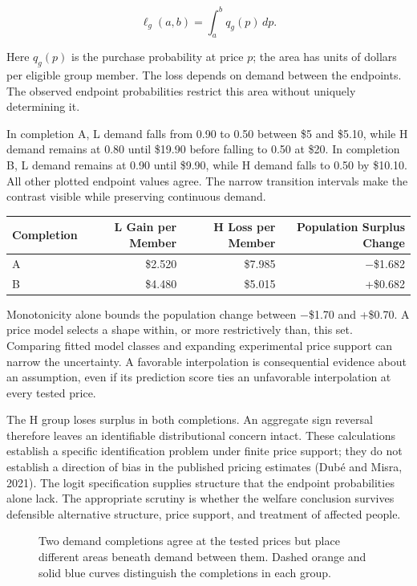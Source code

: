 \[
\ell_g(a,b)=\int_a^b q_g(p)\,dp.
\]

Here \(q_g(p)\) is the purchase probability at price \(p\); the area has
units of dollars per eligible group member. The loss depends on demand
between the endpoints. The observed endpoint probabilities restrict this
area without uniquely determining it.

In completion A, L demand falls from 0.90 to 0.50 between \$5 and
\$5.10, while H demand remains at 0.80 until \$19.90 before falling to
0.50 at \$20. In completion B, L demand remains at 0.90 until \$9.90,
while H demand falls to 0.50 by \$10.10. All other plotted endpoint
values agree. The narrow transition intervals make the contrast visible
while preserving continuous demand.

\begin{table}[H]
\centering\small
\begin{tabular}{@{}lrrr@{}}
\toprule
Completion & L Gain per Member & H Loss per Member & Population Surplus
Change \\
\midrule

A & \$2.520 & \$7.985 & −\$1.682 \\
B & \$4.480 & \$5.015 & +\$0.682 \\
\bottomrule
\end{tabular}
\end{table}

Monotonicity alone bounds the population change between −\$1.70 and
+\$0.70. A price model selects a shape within, or more restrictively
than, this set. Comparing fitted model classes and expanding
experimental price support can narrow the uncertainty. A favorable
interpolation is consequential evidence about an assumption, even if its
prediction score ties an unfavorable interpolation at every tested
price.

The H group loses surplus in both completions. An aggregate sign
reversal therefore leaves an identifiable distributional concern intact.
These calculations establish a specific identification problem under
finite price support; they do not establish a direction of bias in the
published pricing estimates (Dubé and Misra, 2021). The logit
specification supplies structure that the endpoint probabilities alone
lack. The appropriate scrutiny is whether the welfare conclusion
survives defensible alternative structure, price support, and treatment
of affected people.

\begin{figure}[htbp]
\centering

\caption{Two demand completions agree at the tested prices but place different areas beneath demand between them. Dashed orange and solid blue curves distinguish the completions in each group.}\label{fig:M09_demand_completions}
\end{figure}

